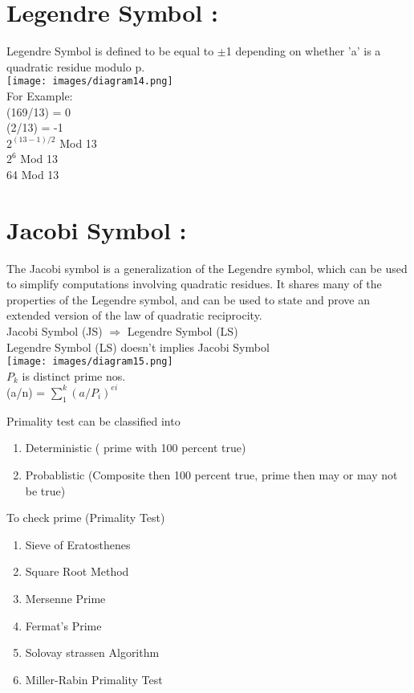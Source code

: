 \documentclass{article}
\begin{document}
\section{Legendre Symbol :}
Legendre Symbol is defined to be equal to $\pm$1 depending on whether 'a' is a quadratic residue modulo p. \\
\texttt{[image: images/diagram14.png]}
\\ For Example:
\\ (169/13) = 0 \\
(2/13) = -1 \\
$2^{(13-1)/2}$ Mod 13 \\
$2^{6}$ Mod 13 \\
64 Mod 13
\section{Jacobi Symbol :}
The Jacobi symbol is a generalization of the Legendre symbol, which can be used to simplify computations involving quadratic residues. It shares many of the properties of the Legendre symbol, and can be used to state and prove an extended version of the law of quadratic reciprocity. \\
Jacobi Symbol (JS) $\Rightarrow$ Legendre Symbol (LS) \\
Legendre Symbol (LS) doesn't implies Jacobi Symbol \\
\texttt{[image: images/diagram15.png]}\\
$P_k$ is distinct prime nos.\\
(a/n) =  $\sum_{1}^{k} (a/P_i)^{ei}$

Primality test can be classified into
\begin{enumerate}
    \item Deterministic ( prime with 100 percent true)
    \item Probablistic (Composite then 100 percent true, prime then may or may not be true)
\end{enumerate}
To check prime (Primality Test)
\begin{enumerate}
    \item Sieve of Eratosthenes
    \item Square Root Method
    \item Mersenne Prime
    \item Fermat's Prime
    \item Solovay strassen Algorithm
    \item Miller-Rabin Primality Test
    
\end{enumerate}
\end{document}
